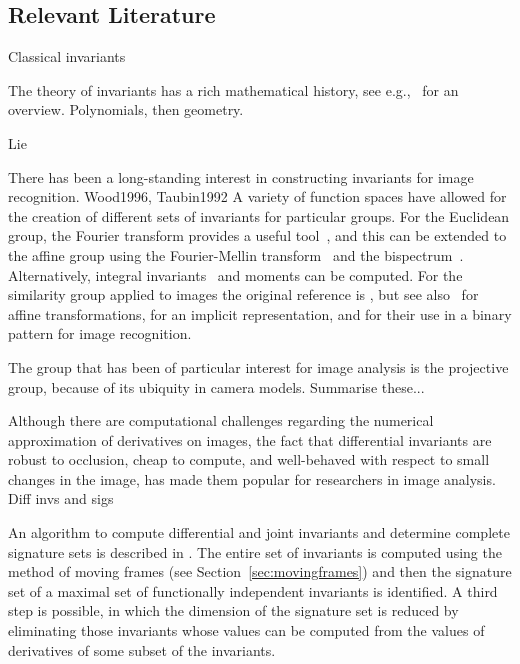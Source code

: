 \documentclass[review,onefignum,onetabnum]{siamonline190516}
\begin{document}
\subsection{Relevant Literature}

Classical invariants

The theory of invariants has a rich mathematical history, see e.g.,~\cite{OlverCIT,Kraft2002} for an overview. Polynomials, then geometry. 

Lie

\cite{Cayley,Littlewood44,Cartan52,Patterson1928,Veblen1872,Lie1884}
\cite{VanGool1995}

\cite{Kakarala2011}

There has been a long-standing interest in constructing invariants for image recognition.
Wood1996,
Taubin1992
A variety of function spaces have allowed for the creation of different sets of invariants for particular groups. For the Euclidean group, the Fourier transform provides a useful tool~\cite{Ghorbel1994,Turski2006,Smach2007,Gauthier2008}, and this can be extended to the affine group using the Fourier-Mellin transform~\cite{Reddy1996,Zhang2019} and the bispectrum~\cite{Kakarala2009,Negrinho2013}. Alternatively, integral invariants~\cite{Manay2006,Feng2010} and moments can be computed. For the similarity group applied to images the original reference is \cite{Hu1962}, but see also~\cite{Hickman2011} for affine transformations, \cite{Flusser2009} for an implicit representation, and \cite{Papakostas2013} for their use in a binary pattern for image recognition.

The group that has been of particular interest for image analysis is the projective group, because of its ubiquity in camera models. Summarise these...
\cite{Suk2000,Suk2004,Hann2002a,Kogan2014,Li19}
\cite{Gros1992,Hubert2007}

Although there are computational challenges regarding the numerical approximation of derivatives on images, the fact that differential invariants are robust to occlusion, cheap to compute, and well-behaved with respect to small changes in the image, has made them popular for researchers in image analysis. 
Diff invs and sigs

An algorithm to compute differential and joint invariants and determine complete signature sets is described in \cite{Olver2005}. The entire set of invariants is computed using the method of moving frames (see Section~\ref{sec:movingframes}) and then the signature set of a maximal set of functionally independent invariants is identified. A third step is possible, in which the dimension of the signature set is reduced by eliminating those invariants whose values can be computed from the values of derivatives of some subset of the invariants.
\end{document}
